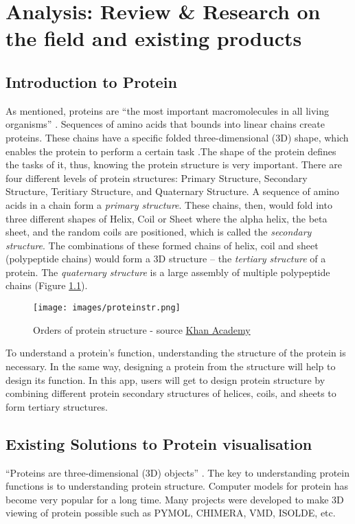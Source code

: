 \chapter{Analysis: Review \& Research on the field and existing products}
\label{ch:litRev}

\section{Introduction to Protein}

As mentioned, proteins are “the most important macromolecules in all living organisms” \parencite{rashid_protein_nodate}. Sequences of amino acids that bounds into linear chains create proteins. These chains have a specific folded three-dimensional (3D) shape, which enables the protein to perform a certain task \parencite{rashid_protein_nodate}.The shape of the protein defines the tasks of it, thus, knowing the protein structure is very important. There are four different levels of protein structures: Primary Structure, Secondary Structure, Teritiary Structure, and Quaternary Structure. A sequence of amino acids in a chain form a \emph{primary structure}. These chains, then, would fold into three different shapes of Helix, Coil or Sheet where the alpha helix, the beta sheet, and the random coils are positioned, which is called the \emph{secondary structure}. The combinations of these formed chains of helix, coil and sheet (polypeptide chains) would form a 3D structure – the \emph{tertiary structure} of a protein. The \emph{quaternary structure} is a large assembly of multiple polypeptide chains (Figure \ref{fig:proteinstr}).
 \begin{figure}[!htp]
	\centering
	\texttt{[image: images/proteinstr.png]}
	\caption{Orders of protein structure - source \href{https://www.khanacademy.org/science/biology/macromolecules/proteins-and-amino-acids/a/orders-of-protein-structure}{Khan Academy}\parencite{noauthor_introduction_nodate}}
	\label{fig:proteinstr}
\end{figure}

To understand a protein’s function, understanding the structure of the protein is necessary. In the same way, designing a protein from the structure will help to design its function. 
In this app, users will get to design protein structure by combining different protein secondary structures of helices, coils, and sheets to form tertiary structures. 


\section{Existing Solutions to Protein visualisation}
 “Proteins are three-dimensional (3D) objects” \parencite{ratamero_touching_2018}. The key to understanding protein functions is to understanding protein structure. Computer models for protein has become very popular for a long time. Many projects were developed to make 3D viewing of protein possible such as {\footnotesize PYMOL, CHIMERA, VMD, ISOLDE,} etc. 
 
